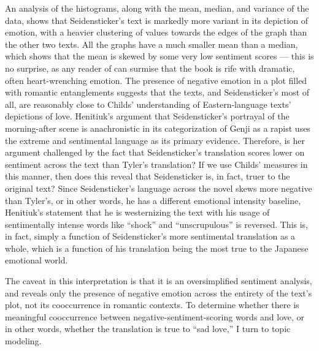 \documentclass[12pt]{article}
\begin{document}
\begin{flushleft}
\begin{spacing}{2.0}
An analysis of the histograms, along with the mean, median, and variance of the data, shows that Seidensticker's text is markedly more variant in its depiction of emotion, with a heavier clustering of values towards the edges of the graph than the other two texts. All the graphs have a much smaller mean than a median, which shows that the mean is skewed by some very low sentiment scores --- this is no surprise, as any reader of  can surmise that the book is rife with dramatic, often heart-wrenching emotion. The presence of negative emotion in a plot filled with romantic entanglements suggests that the texts, and Seidensticker's most of all, are reasonably close to Childs' understanding of Eastern-language texts' depictions of love. Henitiuk's argument that Seidensticker's portrayal of the morning-after scene is anachronistic in its categorization of Genji as a rapist uses the extreme and sentimental language as its primary evidence. Therefore, is her argument challenged by the fact that Seidensticker's translation scores lower on sentiment across the text than Tyler's translation? If we use Childs' measures in this manner, then does this reveal that  Seidensticker is, in fact, truer to the original text? Since Seidensticker's language across the novel skews more negative than Tyler's, or in other words, he has a different emotional intensity baseline, Henitiuk's statement that he is westernizing the text with his usage of sentimentally intense words like ``shock'' and ``unscrupulous'' is reversed. This is, in fact, simply a function of Seidensticker's more sentimental translation as a whole, which is a function of his translation being the most true to the Japanese emotional world.

The caveat in this interpretation is that it is an oversimplified sentiment analysis, and reveals only the presence of negative emotion across the entirety of the text's plot, not its cooccurrence in romantic contexts. To determine whether there is meaningful cooccurrence between negative-sentiment-scoring words and love, or in other words, whether the translation is true to ``sad love,'' I turn to topic modeling. 


\end{spacing}
\end{flushleft}
\end{document}
